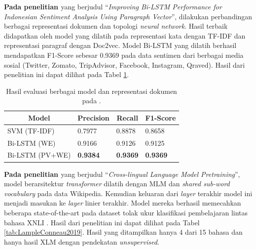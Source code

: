 \textbf{Pada penelitian \parencite{CrisdayantiPurwarianti2019}} yang berjudul “\textit{Improving Bi-LSTM Performance for Indonesian Sentiment Analysis Using Paragraph Vector}”, dilakukan perbandingan berbagai representasi dokumen dan topologi \textit{neural network}. Hasil terbaik didapatkan oleh model yang dilatih pada representasi kata dengan TF-IDF dan representasi paragraf dengan Doc2vec. Model Bi-LSTM yang dilatih berhasil mendapatkan F1-Score sebesar 0.9369 pada data sentimen dari berbagai media sosial (Twitter, Zomato, TripAdvisor, Facebook, Instagram, Qraved). Hasil dari penelitian ini dapat dilihat pada Tabel \ref{tab:CrisdayantiPurwarianti2019}.

\begin{table}[]
    \centering
    \caption{Hasil evaluasi berbagai model dan representasi dokumen pada \parencite{CrisdayantiPurwarianti2019}.}
    \begin{tabular}{|l|l|l|l|}
    \hline
    \multicolumn{1}{|c|}{\textbf{Model}} & \multicolumn{1}{c|}{\textbf{Precision}} & \multicolumn{1}{c|}{\textbf{Recall}} & \textbf{F1-Score} \\ \hline
    SVM (TF-IDF)                         & 0.7977                                  & 0.8878                               & 0.8658            \\ \hline
    Bi-LSTM (WE)                         & 0.9166                                  & 0.9126                               & 0.9125            \\ \hline
    Bi-LSTM (PV+WE)                      & \textbf{0.9384}                         & \textbf{0.9369}                      & \textbf{0.9369}   \\ \hline
    \end{tabular}
    \label{tab:CrisdayantiPurwarianti2019}
\end{table}


\textbf{Pada penelitian \parencite{LampleConneau2019}} yang berjudul “\textit{Cross-lingual Language Model Pretraining}”, model berarsitektur \textit{transformer} dilatih dengan MLM dan \textit{shared sub-word vocabulary} pada data Wikipedia. Kemudian keluaran dari \textit{layer} terakhir model ini menjadi masukan ke \textit{layer} linier terakhir. Model mereka berhasil memecahkan beberapa state-of-the-art pada  dataset tolak ukur klasifikasi pembelajaran lintas bahasa XNLI \parencite{Conneau_Rinott_Lample_Williams_Bowman_Schwenk_Stoyanov_2018}. Hasil dari penelitian ini dapat dilihat pada Tabel \ref{tab:LampleConneau2019}. Hasil yang ditampilkan hanya 4 dari 15 bahasa dan hanya hasil XLM dengan pendekatan \textit{unsupervised}.

